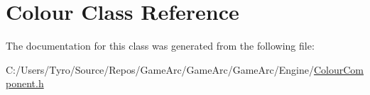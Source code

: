 \hypertarget{class_colour}{}\section{Colour Class Reference}
\label{class_colour}


The documentation for this class was generated from the following file\+:\begin{DoxyCompactItemize}
\item 
C\+:/\+Users/\+Tyro/\+Source/\+Repos/\+Game\+Arc/\+Game\+Arc/\+Game\+Arc/\+Engine/\mbox{\hyperlink{_colour_component_8h}{Colour\+Component.\+h}}\end{DoxyCompactItemize}
